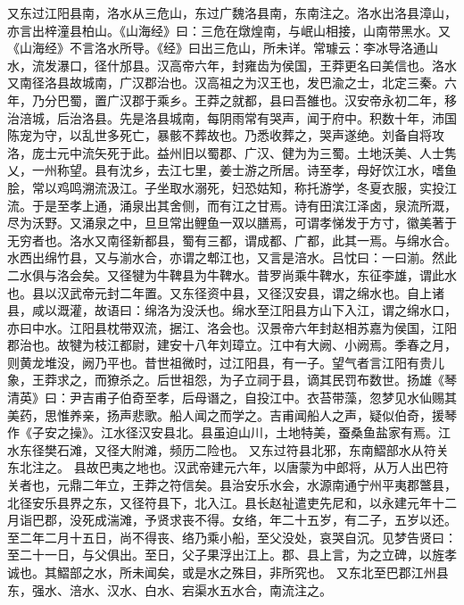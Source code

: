 \documentclass[12pt,UTF8]{ctexbook}
\begin{document}
又东过江阳县南，洛水从三危山，东过广魏洛县南，东南注之。洛水出洛县漳山，亦言出梓潼县柏山。《山海经》曰：三危在燉煌南，与岷山相接，山南带黑水。又《山海经》不言洛水所导。《经》曰出三危山，所未详。常璩云：李冰导洛通山水，流发瀑口，径什邡县。汉高帝六年，封雍齿为侯国，王莽更名曰美信也。洛水又南径洛县故城南，广汉郡治也。汉高祖之为汉王也，发巴渝之士，北定三秦。六年，乃分巴蜀，置广汉郡于乘乡。王莽之就都，县曰吾雒也。汉安帝永初二年，移治涪城，后治洛县。先是洛县城南，每阴雨常有哭声，闻于府中。积数十年，沛国陈宠为守，以乱世多死亡，暴骸不葬故也。乃悉收葬之，哭声遂绝。刘备自将攻洛，庞士元中流矢死于此。益州旧以蜀郡、广汉、健为为三蜀。土地沃美、人士隽乂，一州称望。县有沈乡，去江七里，姜士游之所居。诗至孝，母好饮江水，嗜鱼脍，常以鸡鸣溯流汲江。子坐取水溺死，妇恐姑知，称托游学，冬夏衣服，实投江流。于是至孝上通，涌泉出其舍侧，而有江之甘焉。诗有田滨江泽卤，泉流所溉，尽为沃野。又涌泉之中，旦旦常出鲤鱼一双以膳焉，可谓孝悌发于方寸，徽美著于无穷者也。洛水又南径新都县，蜀有三都，谓成都、广都，此其一焉。与绵水合。水西出绵竹县，又与湔水合，亦谓之郫江也，又言是涪水。吕忱曰：一曰湔。然此二水俱与洛会矣。又径犍为牛鞞县为牛鞞水。昔罗尚乘牛鞞水，东征李雄，谓此水也。县以汉武帝元封二年置。又东径资中县，又径汉安县，谓之绵水也。自上诸县，咸以溉灌，故语曰：绵洛为没沃也。绵水至江阳县方山下入江，谓之绵水口，亦曰中水。江阳县枕带双流，据江、洛会也。汉景帝六年封赵相苏嘉为侯国，江阳郡治也。故犍为枝江都尉，建安十八年刘璋立。江中有大阙、小阙焉。季春之月，则黄龙堆没，阙乃平也。昔世祖微时，过江阳县，有一子。望气者言江阳有贵儿象，王莽求之，而獠杀之。后世祖怨，为子立祠于县，谪其民罚布数世。扬雄《琴清英》曰：尹吉甫子伯奇至孝，后母谮之，自投江中。衣苔带藻，忽梦见水仙赐其美药，思惟养亲，扬声悲歌。船人闻之而学之。吉甫闻船人之声，疑似伯奇，援琴作《子安之操》。江水径汉安县北。县虽迫山川，土地特美，蚕桑鱼盐家有焉。江水东径樊石滩，又径大附滩，频历二险也。
又东过符县北邪，东南鰼部水从符关东北注之。
县故巴夷之地也。汉武帝建元六年，以唐蒙为中郎将，从万人出巴符关者也，元鼎二年立，王莽之符信矣。县治安乐水会，水源南通宁州平夷郡鄨县，北径安乐县界之东，又径符县下，北入江。县长赵祉遣吏先尼和，以永建元年十二月诣巴郡，没死成湍滩，予贤求丧不得。女络，年二十五岁，有二子，五岁以还。至二年二月十五日，尚不得丧、络乃乘小船，至父没处，哀哭自沉。见梦告贤曰：至二十一日，与父俱出。至日，父子果浮出江上。郡、县上言，为之立碑，以旌孝诚也。其鰼部之水，所未闻矣，或是水之殊目，非所究也。
又东北至巴郡江州县东，强水、涪水、汉水、白水、宕渠水五水合，南流注之。
\end{document}
